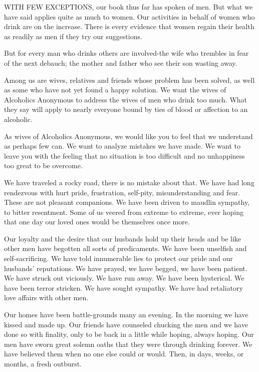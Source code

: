 
\bbChapterPreamble


\begin{biblechapter}
WITH FEW EXCEPTIONS, our book thus far has spoken of men.  But what we have said applies quite as much to women.  Our activities in behalf of women who drink are on the increase.  There is every evidence that women regain their health as readily as men if they try our suggestions.

But for every man who drinks others are involved-the wife who trembles in fear of the next debauch; the mother and father who see their son wasting away.

Among us are wives, relatives and friends whose problem has been solved, as well as some who have not yet found a happy solution.  We want the wives of Alcoholics Anonymous to address the wives of men who drink too much.  What they say will apply to nearly everyone bound by ties of blood or affection to an alcoholic.

As wives of Alcoholics Anonymous, we would like you to feel that we understand as perhaps few can.  We want to analyze mistakes we have made.  We want to leave you with the feeling that no situation is too difficult and no unhappiness too great to be overcome.

We have traveled a rocky road, there is no mistake about that.  We have had long rendezvous with hurt pride, frustration, self-pity, misunderstanding and fear.  These are not pleasant companions.  We have been driven to maudlin sympathy, to bitter resentment.  Some of us veered from extreme to extreme, ever hoping that one day our loved ones would be themselves once more.

Our loyalty and the desire that our husbands hold up their heads and be like other men have begotten all sorts of predicaments.  We have been unselfish and self-sacrificing.  We have told innumerable lies to protect our pride and our husbands' reputations.  We have prayed, we have begged, we have been patient.  We have struck out viciously.  We have run away.  We have been hysterical.  We have been terror stricken.  We have sought sympathy.  We have had retaliatory love affairs with other men.

Our homes have been battle-grounds many an evening.  In the morning we have kissed and made up.  Our friends have counseled chucking the men and we have done so with finality, only to be back in a little while hoping, always hoping.  Our men have sworn great solemn oaths that they were through drinking forever.  We have believed them when no one else could or would.  Then, in days, weeks, or months, a fresh outburst.


\end{biblechapter}
